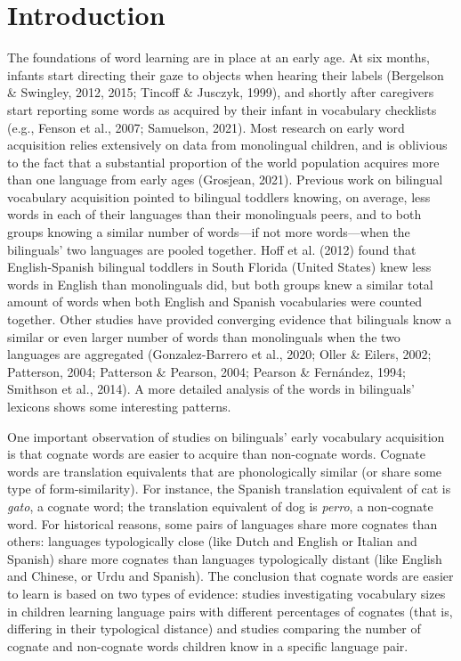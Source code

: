 \documentclass[
  12pt,
  b5paperpaper,
  twoside]{scrreprt}
\begin{document}
\hypertarget{introduction-1}{%
\section{Introduction}\label{introduction-1}}

The foundations of word learning are in place at an early age. At six
months, infants start directing their gaze to objects when hearing their
labels (Bergelson \& Swingley, 2012, 2015; Tincoff \& Jusczyk, 1999),
and shortly after caregivers start reporting some words as acquired by
their infant in vocabulary checklists (e.g., Fenson et al., 2007;
Samuelson, 2021). Most research on early word acquisition relies
extensively on data from monolingual children, and is oblivious to the
fact that a substantial proportion of the world population acquires more
than one language from early ages (Grosjean, 2021). Previous work on
bilingual vocabulary acquisition pointed to bilingual toddlers knowing,
on average, less words in each of their languages than their
monolinguals peers, and to both groups knowing a similar number of
words---if not more words---when the bilinguals' two languages are
pooled together. Hoff et al. (2012) found that English-Spanish bilingual
toddlers in South Florida (United States) knew less words in English
than monolinguals did, but both groups knew a similar total amount of
words when both English and Spanish vocabularies were counted together.
Other studies have provided converging evidence that bilinguals know a
similar or even larger number of words than monolinguals when the two
languages are aggregated (Gonzalez-Barrero et al., 2020; Oller \&
Eilers, 2002; Patterson, 2004; Patterson \& Pearson, 2004; Pearson \&
Fernández, 1994; Smithson et al., 2014). A more detailed analysis of the
words in bilinguals' lexicons shows some interesting patterns.

One important observation of studies on bilinguals' early vocabulary
acquisition is that cognate words are easier to acquire than non-cognate
words. Cognate words are translation equivalents that are phonologically
similar (or share some type of form-similarity). For instance, the
Spanish translation equivalent of cat is \emph{gato}, a cognate word;
the translation equivalent of dog is \emph{perro}, a non-cognate word.
For historical reasons, some pairs of languages share more cognates than
others: languages typologically close (like Dutch and English or Italian
and Spanish) share more cognates than languages typologically distant
(like English and Chinese, or Urdu and Spanish). The conclusion that
cognate words are easier to learn is based on two types of evidence:
studies investigating vocabulary sizes in children learning language
pairs with different percentages of cognates (that is, differing in
their typological distance) and studies comparing the number of cognate
and non-cognate words children know in a specific language pair.
\end{document}
